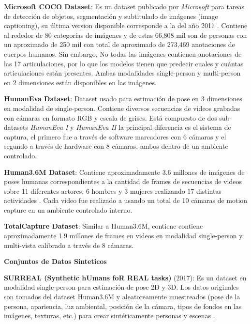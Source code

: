 \textbf{Microsoft COCO Dataset}: Es un dataset publicado por \textit{Microsoft} para tareas de
detección de objetos, segmentación y subtitulado de imágenes (image captioning), su última version
disponible corresponde a la del año 2017 \cite{DBLP:journals/corr/LinMBHPRDZ14}. Contiene al rededor
de 80 categorías de imágenes y de estas 66,808 mil son de personas con un aproximado de 250 mil
con total de aproximado de 273,469 anotaciones de cuerpos humanos. Sin embargo, No todas las
imágenes contienen anotaciones de las 17 articulaciones, por lo que los modelos tienen que predecir
cuales y cuántas articulaciones están presentes. Ambas modalidades single-person y multi-person en 2
dimensiones están disponibles en las imágenes.



\textbf{HumanEva Dataset}: Dataset usado para estimación de pose en 3 dimensiones en modalidad de
single-person. Contiene diversos secuencias de videos grabadas con cámaras en formato RGB y escala
de grises. Está compuesto de dos sub-datasets \textit{HumanEva I} y \textit{HumanEva II} la principal
diferencia es el sistema de captura, el primero fue a través de software marcadores con 6 cámaras
y el segundo a través de hardware con 8 cámaras, ambos dentro de un ambiente controlado.

\textbf{Human3.6M Dataset}: Contiene aproximadamente 3.6 millones de imágenes de poses humanas
correspondientes a la cantidad de frames de secuencias de videos sobre 11 diferentes actores, 6
hombres y 3 mujeres realizando
17 distintas actividades \cite{6682899}. Cada video fue realizado a usando un total de 10 cámaras de
motion capture en un ambiente controlado interno.

\textbf{TotalCapture Dataset}: Similar a Human3.6M, contiene contiene aproximadamente 1.9 millones
de frames en videos en modalidad single-person y multi-vista calibrado a través de 8 cámaras.

\textbf{Conjuntos de Datos Sinteticos}

\textbf{SURREAL (Synthetic hUmans foR REAL tasks)} (2017): Es un dataset en modalidad single-person para
estimación de pose 2D y 3D. Los datos originales son tomados del dataset Human3.6M y aleatoreamente
muestreados (pose de la persona, apariencia, luz ambiental, posición de la cámara, tipos de fondos
en las imágenes, texturas, etc.) para crear sintéticamente personas y escenas
\cite{DBLP:journals/corr/Varol0MMBLS17}.

